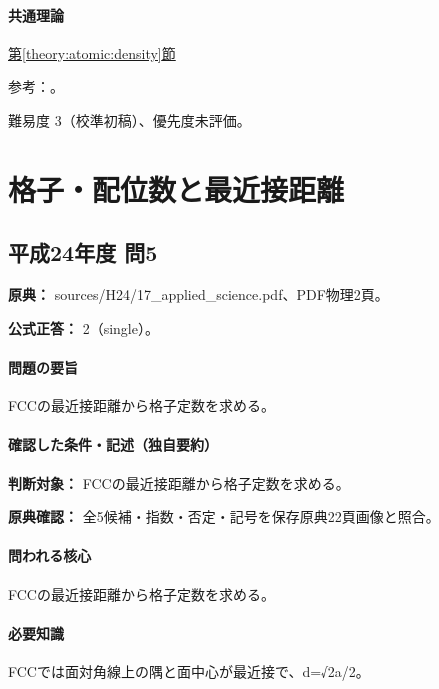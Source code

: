 \paragraph{共通理論} \hyperref[theory:atomic:density]{第\ref*{theory:atomic:density}節}

\par 参考：\cite{openstax_crystals}。

\par 難易度 3（校準初稿）、優先度未評価。

\section{格子・配位数と最近接距離}

\subsection{平成24年度 問5}
\label{q:h24-reg-applied-05}

\noindent\textbf{原典：} sources/H24/17\_applied\_science.pdf、PDF物理2頁。

\textbf{公式正答：} 2（single）。

\paragraph{問題の要旨} FCCの最近接距離から格子定数を求める。

\paragraph{確認した条件・記述（独自要約）}\mbox{}\par

\noindent\textbf{判断対象：} FCCの最近接距離から格子定数を求める。\par

\noindent\textbf{原典確認：} 全5候補・指数・否定・記号を保存原典22頁画像と照合。\par

\paragraph{問われる核心} FCCの最近接距離から格子定数を求める。

\paragraph{必要知識} FCCでは面対角線上の隅と面中心が最近接で、d=√2a/2。

